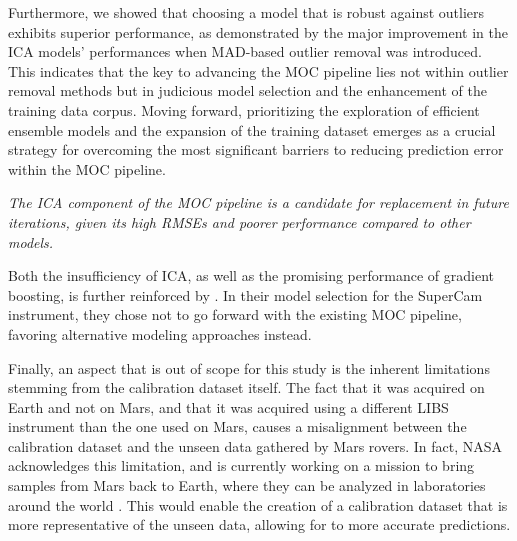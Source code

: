 Furthermore, we showed that choosing a model that is robust against outliers exhibits superior performance, as demonstrated by the major improvement in the ICA models' performances when MAD-based outlier removal was introduced.
This indicates that the key to advancing the MOC pipeline lies not within outlier removal methods but in judicious model selection and the enhancement of the training data corpus.
Moving forward, prioritizing the exploration of efficient ensemble models and the expansion of the training dataset emerges as a crucial strategy for overcoming the most significant barriers to reducing prediction error within the MOC pipeline.

\vspace{2mm}\noindent\textit{The ICA component of the MOC pipeline is a candidate for replacement in future iterations, given its high RMSEs and poorer performance compared to other models.}

\noindent
Both the insufficiency of ICA, as well as the promising performance of gradient boosting, is further reinforced by \citet{andersonPostlandingMajorElement2022}. In their model selection for the SuperCam instrument, they chose not to go forward with the existing MOC pipeline, favoring alternative modeling approaches instead.

\vspace{2mm}\noindent
Finally, an aspect that is out of scope for this study is the inherent limitations stemming from the calibration dataset itself.
The fact that it was acquired on Earth and not on Mars, and that it was acquired using a different LIBS instrument than the one used on Mars, causes a misalignment between the calibration dataset and the unseen data gathered by Mars rovers.
In fact, NASA acknowledges this limitation, and is currently working on a mission to bring samples from Mars back to Earth, where they can be analyzed in laboratories around the world \cite{mars-sample-return}.
This would enable the creation of a calibration dataset that is more representative of the unseen data, allowing for to more accurate predictions.